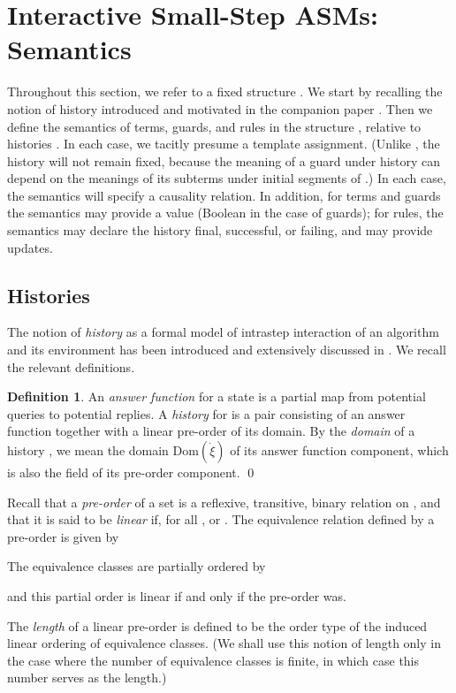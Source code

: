 \documentclass{LMCS}
\theoremstyle{definition}
\newtheorem{df}[thm]{Definition}
\newcommand{\ans}{\dot}
\newcommand{\dom}[1]{\ensuremath{{\text{Dom}}(#1)}}
\begin{document}
\section{Interactive Small-Step ASMs: Semantics}   \label{asm-sem}

Throughout this section, we refer to a fixed structure .  We start by
recalling the notion of history introduced and motivated in the companion
paper \cite{ga1}.  Then we define the semantics of terms, guards, and
rules in the structure , relative to histories .  In each case, we
tacitly presume a template assignment.  (Unlike , the history 
will not remain fixed, because the meaning of a guard under history 
can depend on the meanings of its subterms under initial segments of
.)  In each case, the semantics will specify a causality relation.
In addition, for terms and guards the semantics may provide a value
(Boolean in the case of guards); for rules, the semantics may declare the
history final, successful, or failing, and may provide updates.


\subsection{Histories}

The notion of \emph{history} as a formal model of intrastep interaction of
an algorithm and its environment has been introduced and extensively
discussed in \cite{ga1}.  We recall the relevant definitions.

\begin{df}       \label{ans-fn}
An \emph{answer function} for a state  is a partial map from
potential queries to potential replies.  A \emph{history} for  is
a pair  consisting of an answer function
 together with a linear pre-order  of its domain.
By the \emph{domain} of a history , we mean the domain
\dom{\ans\xi} of its answer function component, which is also the
field of its pre-order component. \qed\end{df}

Recall that a \emph{pre-order} of a set  is a reflexive,
transitive, binary relation on , and that it is said to be
\emph{linear} if, for all ,  or .  The
equivalence relation defined by a pre-order is given by

The equivalence classes are partially ordered by

and this partial order is linear if and only if the pre-order was.

The \emph{length} of a linear pre-order is defined to be the order
type of the induced linear ordering of equivalence classes.  (We
shall use this notion of length only in the case where the number of
equivalence classes is finite, in which case this number serves as
the length.)
\end{document}
